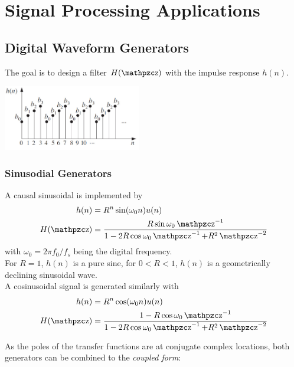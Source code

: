 \section{Signal Processing Applications}
\subsection{Digital Waveform Generators}

The goal is to design a filter $H(\z)$ with the impulse response $h(n)$.

\begin{center}
	\includegraphics[width=6cm]{images/SignProcApp_DigWaveFormGenerator.jpg}
\end{center}

\subsubsection{Sinusodial Generators}
A causal sinusoidal is implemented by
\begin{align*}
	h(n) &= R^n \sin(\omega_0 n)u(n) \\
	H(\z) &= \frac{R \sin \omega_0 \z^{-1}}{1-2R\cos \omega_0 \z^{-1} + R^2 \z^{-2}}
\end{align*}
with $\omega_0 = 2 \pi f_0 / f_s$ being the digital frequency. \\

For $R=1$, $h(n)$ is a pure sine, for $0<R<1$, $h(n)$ is a geometrically declining sinusoidal wave. \\

A cosinusoidal signal is generated similarly with
\begin{align*}
	h(n) &= R^n \cos(\omega_0 n)u(n) \\
	H(\z) &= \frac{1 - R \cos \omega_0 \z^{-1}}{1-2R\cos \omega_0 \z^{-1} + R^2 \z^{-2}}
\end{align*}

As the poles of the transfer functions are at conjugate complex locations, both generators can be combined to the \emph{coupled form}:

